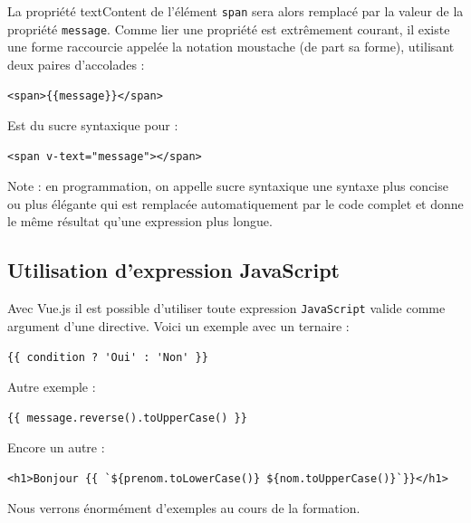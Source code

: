 \documentclass{article}
\begin{document}
La propriété {\color{blue}textContent} de l'élément {\tt span} sera alors remplacé par la valeur de la propriété {\tt message}. Comme lier une propriété est extrêmement courant, il existe une forme raccourcie appelée la notation moustache (de part sa forme), utilisant deux paires d'accolades :
\begin{verbatim}
<span>{{message}}</span>
\end{verbatim}

Est du sucre syntaxique pour :
\begin{verbatim}
<span v-text="message"></span>
\end{verbatim}

Note : en programmation, on appelle sucre syntaxique une syntaxe plus concise ou plus élégante qui est remplacée automatiquement par le code complet et donne le même résultat qu'une expression plus longue.

\subsection{Utilisation d'expression JavaScript}
Avec {\color{monOrange}Vue.js} il est possible d'utiliser toute expression {\tt JavaScript} valide comme argument d'une directive. Voici un exemple avec un ternaire :
\begin{verbatim}
{{ condition ? 'Oui' : 'Non' }}
\end{verbatim}
Autre exemple :
\begin{verbatim}
{{ message.reverse().toUpperCase() }}
\end{verbatim}

Encore un autre :
\begin{verbatim}
<h1>Bonjour {{ `${prenom.toLowerCase()} ${nom.toUpperCase()}`}}</h1>
\end{verbatim}

Nous verrons énormément d'exemples au cours de la formation.

\end{document}
